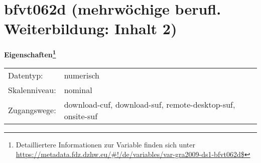 
    \setcounter{footnote}{0}

    \vspace*{-1.8cm}
	\section{bfvt062d (mehrwöchige berufl. Weiterbildung: Inhalt 2)}
	\label{section:bfvt062d}



    \vspace*{0.5cm}
    \noindent\textbf{Eigenschaften\footnote{Detailliertere Informationen zur Variable finden sich unter
		\url{https://metadata.fdz.dzhw.eu/\#!/de/variables/var-gra2009-ds1-bfvt062d$}}}\\
	\begin{tabularx}{\hsize}{@{}lX}
	Datentyp: & numerisch \\
	Skalenniveau: & nominal \\
	Zugangswege: &
	  download-cuf, 
	  download-suf, 
	  remote-desktop-suf, 
	  onsite-suf
 \\
    \end{tabularx}



